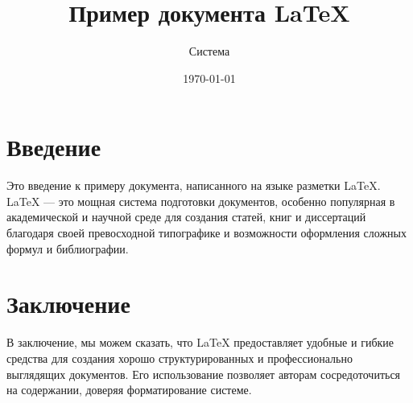 \documentclass{article}
\title{Пример документа LaTeX}
\author{Система}
\date{\today}
\begin{document}
\maketitle

\section{Введение}
Это введение к примеру документа, написанного на языке разметки LaTeX. LaTeX — это мощная система подготовки документов, особенно популярная в академической и научной среде для создания статей, книг и диссертаций благодаря своей превосходной типографике и возможности оформления сложных формул и библиографии.

\section{Заключение}
В заключение, мы можем сказать, что LaTeX предоставляет удобные и гибкие средства для создания хорошо структурированных и профессионально выглядящих документов. Его использование позволяет авторам сосредоточиться на содержании, доверяя форматирование системе.
\end{document}
